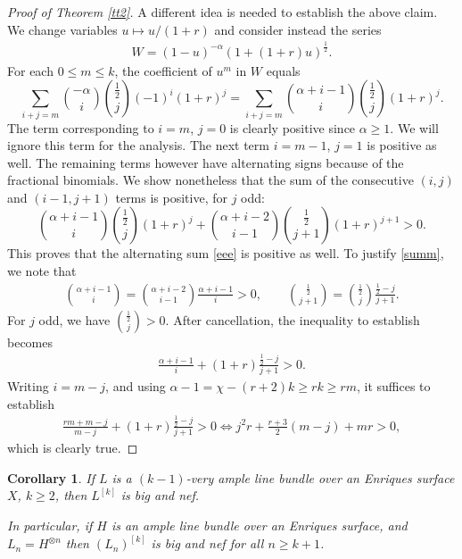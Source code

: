 \documentclass[pdftex]{sigma}
\numberwithin{equation}{section}
\newtheorem{Corollary}[Theorem]{Corollary}
\begin{document}
\begin{proof}[Proof of Theorem \ref{tt2}]
A different idea is needed to establish the above claim. We change variables $u\mapsto u/(1+r)$ and consider instead the series
\begin{gather*}
W=(1-u)^{-\alpha}(1+(1+r)u)^{\frac{1}{2}}.
\end{gather*}
For each $0\leq m\leq k$, the coefficient of $u^m$ in $W$ equals
 \begin{equation}\label{eee}
 \sum_{i+j=m} \binom {-\alpha}{i} \binom{\frac{1}{2}}{j} (-1)^{i} (1+r)^j=\sum_{i+j=m} \binom{\alpha+i-1}{i} \binom{\frac{1}{2}}{j} (1+r)^j.
 \end{equation}
 The term corresponding to $i=m$, $j=0$ is clearly positive since $\alpha\geq 1$. We will ignore this term for the analysis. The next term $i=m-1$, $j=1$ is positive as well. The remaining terms however have alternating signs because of the fractional binomials. We show nonetheless that the sum of the consecutive $(i, j)$ and $(i-1, j+1)$ terms is positive, for $j$ odd:
\begin{equation}\label{summ}
\binom {\alpha+i-1}{i} \binom{\frac{1}{2}}{j} (1+r)^j+\binom {\alpha+i-2}{i-1} \binom{\frac{1}{2}}{j+1} (1+r)^{j+1}>0.
\end{equation}
This proves that the alternating sum \eqref{eee} is positive as well. To justify \eqref{summ}, we note that
\begin{gather*}
\binom {\alpha+i-1}{i}=\binom {\alpha+i-2}{i-1} \frac{\alpha+i-1}{i}>0, \qquad \binom{\frac{1}{2}}{j+1} = \binom{\frac{1}{2}}{j} \frac{\frac{1}{2}-j}{j+1}.
\end{gather*}
For $j$ odd, we have $\binom{\frac{1}{2}}{j} >0$. After cancellation, the inequality to establish becomes
\begin{gather*}
\frac{\alpha+i-1}{i}+(1+r) \frac{\frac{1}{2}-j}{j+1}>0.
\end{gather*}
Writing $i=m-j$, and using $\alpha-1=\chi-(r+2)k\geq rk\geq rm$, it suffices to establish
\begin{gather*}
\frac{rm+m-j}{m-j}+(1+r) \frac{\frac{1}{2}-j}{j+1}>0\iff j^2r+\frac{r+3}{2} (m-j)+mr>0,
\end{gather*} which is clearly true.
\end{proof}

\begin{Corollary}
If $L$ is a $(k-1)$-very ample line bundle over an Enriques surface $X$, $k\geq 2$, then $L^{[k]}$ is big and nef.

In particular, if $H$ is an ample line bundle over an Enriques surface, and $L_n=H^{\otimes n}$ then $(L_n)^{[k]}$ is big and nef for all $n\geq k+1$.
\end{Corollary}
\end{document}
